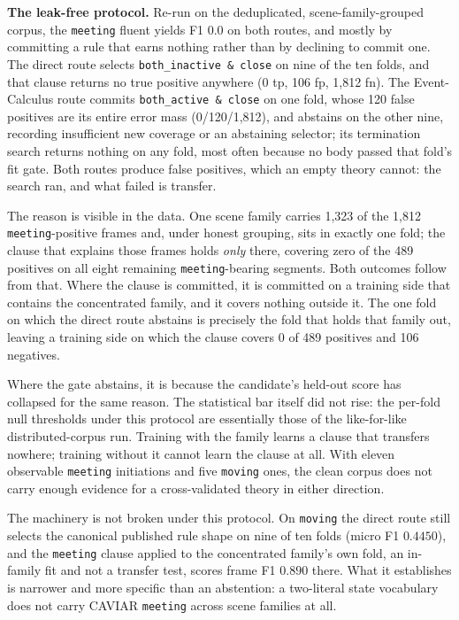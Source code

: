 \textbf{The leak-free protocol.} Re-run on the deduplicated, scene-family-grouped corpus, the \texttt{meeting} fluent yields F1 $0.0$ on both routes, and mostly by committing a rule that earns nothing rather than by declining to commit one. The direct route selects \texttt{both\_inactive \& close} on nine of the ten folds, and that clause returns no true positive anywhere (0 tp, 106 fp, 1{,}812 fn). The Event-Calculus route commits \texttt{both\_active \& close} on one fold, whose 120 false positives are its entire error mass (0/120/1{,}812), and abstains on the other nine, recording insufficient new coverage or an abstaining selector; its termination search returns nothing on any fold, most often because no body passed that fold's fit gate. Both routes produce false positives, which an empty theory cannot: the search ran, and what failed is transfer.

The reason is visible in the data. One scene family carries 1{,}323 of the 1{,}812 \texttt{meeting}-positive frames and, under honest grouping, sits in exactly one fold; the clause that explains those frames holds \emph{only} there, covering zero of the 489 positives on all eight remaining \texttt{meeting}-bearing segments. Both outcomes follow from that. Where the clause is committed, it is committed on a training side that contains the concentrated family, and it covers nothing outside it. The one fold on which the direct route abstains is precisely the fold that holds that family out, leaving a training side on which the clause covers 0 of 489 positives and 106 negatives.

Where the gate abstains, it is because the candidate's held-out score has collapsed for the same reason. The statistical bar itself did not rise: the per-fold null thresholds under this protocol are essentially those of the like-for-like distributed-corpus run. Training with the family learns a clause that transfers nowhere; training without it cannot learn the clause at all. With eleven observable \texttt{meeting} initiations and five \texttt{moving} ones, the clean corpus does not carry enough evidence for a cross-validated theory in either direction.

The machinery is not broken under this protocol. On \texttt{moving} the direct route still selects the canonical published rule shape on nine of ten folds (micro F1 $0.4450$), and the \texttt{meeting} clause applied to the concentrated family's own fold, an in-family fit and not a transfer test, scores frame F1 $0.890$ there. What it establishes is narrower and more specific than an abstention: a two-literal state vocabulary does not carry CAVIAR \texttt{meeting} across scene families at all.

